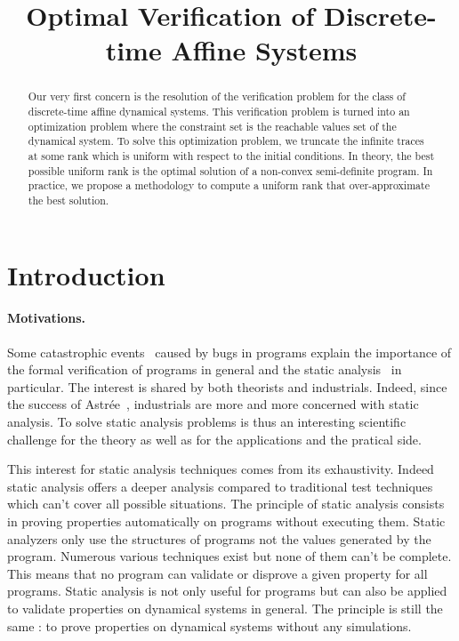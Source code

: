 \documentclass[10pt]{llncs}
\title{Optimal Verification of Discrete-time Affine Systems}
\begin{document}
\maketitle
\begin{abstract}
 Our very first concern is the resolution of the verification problem for the class of discrete-time affine dynamical systems. This verification problem is turned into an optimization problem where the constraint set is the reachable values set of the dynamical system. To solve this optimization problem, we truncate the infinite traces at some rank which is uniform with respect to the initial conditions. In theory, the best possible uniform rank is the optimal solution of a non-convex semi-definite program. In practice,  we propose a methodology to compute a uniform rank that over-approximate the best solution.
\end{abstract}

\section{Introduction}
\paragraph{Motivations.}
Some catastrophic events~\cite{johnson2005natural,mcquaid2012software} caused by bugs in programs explain the importance of the formal verification of programs in general and the static analysis~\cite{cousot2010gentle} in particular. The interest is shared by both theorists and industrials. Indeed, since the success of Astrée~\cite{delmas2007astree,souyris2007experimental,bouissou2009space}, industrials are  more and more concerned with static analysis.  To solve static analysis problems is thus an interesting scientific challenge for the theory as well as for the applications and the pratical  side.   

This interest for static analysis techniques comes from its exhaustivity. Indeed static analysis offers a deeper analysis compared to traditional test techniques which can't cover all possible situations. The principle of static analysis consists in proving properties automatically on programs without executing them. Static analyzers only use the structures of programs not the values generated by the program.  Numerous various techniques exist but none of them can't be complete. This means that no program can validate or disprove a given property for all programs. Static analysis is not only useful for programs but can also be applied to validate properties on dynamical systems in general. The principle is still the same : to prove properties on dynamical systems without any simulations.
\end{document}
